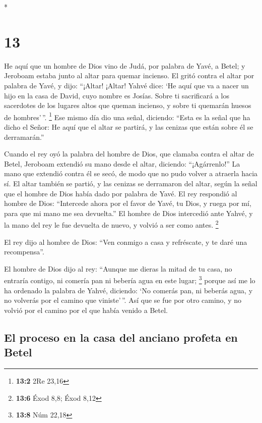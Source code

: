 \begin{paracol}{2}
\begin{otherlanguage}{english}
\end{otherlanguage}

\switchcolumn[0]*

\hypertarget{section-24}{%
\section{13}\label{section-24}}

 He aquí que un hombre de Dios vino de Judá, por palabra
de Yavé, a Betel; y Jeroboam estaba junto al altar para quemar incienso.
 El gritó contra el altar por palabra de Yavé, y dijo:
``¡Altar! ¡Altar! Yahvé dice: `He aquí que va a nacer un hijo en la casa
de David, cuyo nombre es Josías. Sobre ti sacrificará a los sacerdotes
de los lugares altos que queman incienso, y sobre ti quemarán huesos de
hombres'\,''. \footnote{\textbf{13:2} 2Re 23,16}  Ese
mismo día dio una señal, diciendo: ``Esta es la señal que ha dicho el
Señor: He aquí que el altar se partirá, y las cenizas que están sobre él
se derramarán.''

 Cuando el rey oyó la palabra del hombre de Dios, que
clamaba contra el altar de Betel, Jeroboam extendió su mano desde el
altar, diciendo: ``¡Agárrenlo!'' La mano que extendió contra él se secó,
de modo que no pudo volver a atraerla hacia sí.  El altar
también se partió, y las cenizas se derramaron del altar, según la señal
que el hombre de Dios había dado por palabra de Yavé.  El
rey respondió al hombre de Dios: ``Intercede ahora por el favor de Yavé,
tu Dios, y ruega por mí, para que mi mano me sea devuelta.'' El hombre
de Dios intercedió ante Yahvé, y la mano del rey le fue devuelta de
nuevo, y volvió a ser como antes. \footnote{\textbf{13:6} Éxod 8,8; Éxod
  8,12}

 El rey dijo al hombre de Dios: ``Ven conmigo a casa y
refréscate, y te daré una recompensa''.

 El hombre de Dios dijo al rey: ``Aunque me dieras la
mitad de tu casa, no entraría contigo, ni comería pan ni bebería agua en
este lugar; \footnote{\textbf{13:8} Núm 22,18}  porque así
me lo ha ordenado la palabra de Yahvé, diciendo: `No comerás pan, ni
beberás agua, y no volverás por el camino que viniste'\,''.
 Así que se fue por otro camino, y no volvió por el
camino por el que había venido a Betel.

\hypertarget{el-proceso-en-la-casa-del-anciano-profeta-en-betel}{%
\subsection{El proceso en la casa del anciano profeta en
Betel}\label{el-proceso-en-la-casa-del-anciano-profeta-en-betel}}


\end{paracol}
